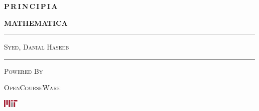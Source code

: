 \documentclass[../main]{subfiles}
\begin{document}
\begin{titlingpage}
  {\Huge \textbf{P\,R\,I\,N\,C\,I\,P\,I\,A}}
  
  \vspace*{\parskip}

  {
    \huge
    \textbf{MATHEMATICA}}\\[\parskip]
    \rule{\textwidth}{\heavyrulewidth
  }
  \vspace*{2em}

  \color{MITgray} {\LARGE \textsc{Syed, Danial Haseeb}}

  \vfill

  \color{MITgray} \rule{\textwidth}{\normalrulethickness}
  
  {\large \textsc{Powered By}}
  \vspace{1em}
  
  \color{MITred} \textsc{OpenCourseWare}

  \includegraphics[height = 1em]{images/MIT.pdf}
\end{titlingpage}
\end{document}
